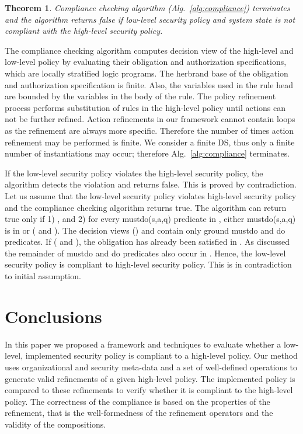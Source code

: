\documentclass[12pt,journal,letterpaper,onecolumn]{IEEEtran}
\newtheorem{theorem}{Theorem}[section]
\newenvironment{myproofsketch}
{\noindent {\bf Proof Sketch:}}{\hspace*{\fill}}
\begin{document}
\begin{theorem}
Compliance checking algorithm (Alg.~\ref{alg:compliance}) terminates
and the algorithm returns false if low-level security policy and
system state is not compliant with the high-level security policy.
\end{theorem}
\begin{myproofsketch} The compliance checking algorithm computes decision
view of the high-level and low-level policy by evaluating their
obligation and authorization specifications, which are locally
stratified logic programs. The herbrand base of the obligation and
authorization specification is finite. Also, the variables used in
the rule head are bounded by the variables in the body of the rule.
The policy refinement process performs substitution of rules in the 
high-level policy until actions can not be further refined. Action refinements
in our framework cannot contain loops as the refinement are always
more specific. Therefore the number of times action refinement may
be performed is finite. We consider a finite DS, thus only a 
finite number of instantiations may occur; 
therefore Alg.~\ref{alg:compliance} terminates.

If the low-level security policy violates the high-level security
policy, the algorithm detects the violation and returns false. This
is proved by contradiction. Let us assume that the low-level
security policy  violates high-level security policy  and
the compliance checking algorithm returns true. The algorithm can
return true only if 1) , and 2) for every
mustdo(s,a,q) predicate in , either mustdo(s,a,q) is in 
or ( and ). The
decision views () and  contain only
ground mustdo and do predicates. If ( and
), the obligation  has already been
satisfied in . As discussed the remainder of mustdo and do
predicates also occur in . Hence, the low-level
security policy is compliant to high-level security policy. This is
in contradiction to initial assumption.
\end{myproofsketch}




\section{Conclusions}
\label{sec:conclude} In this paper we proposed a framework and
techniques to evaluate whether a low-level, implemented security
policy is compliant to a high-level policy.  Our method uses
organizational and security meta-data and a set of well-defined
operations to generate valid refinements of a given high-level
policy.  The implemented policy is compared to these refinements to
verify whether it is compliant to the high-level policy.  The
correctness of the compliance is based on the properties of the
refinement, that is the well-formedness of the refinement operators
and the validity of the compositions.
\end{document}
